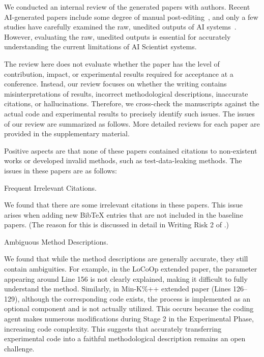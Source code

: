 \label{sec:author_evaluation}
We conducted an internal review of the generated papers with authors.
Recent AI-generated papers include some degree of manual post-editing~\citep{zochi2025, weng2025deepscientist}, and only a few studies have carefully examined the raw, unedited outputs of AI systems~\citep{yamada2025ai}.
However, evaluating the raw, unedited outputs is essential for accurately understanding the current limitations of AI Scientist systems.

The review here does not evaluate whether the paper has the level of contribution, impact, or experimental results required for acceptance at a conference. Instead, our review focuses on whether the writing contains misinterpretations of results, incorrect methodological descriptions, inaccurate citations, or hallucinations.
Therefore, we cross-check the manuscripts against the actual code and experimental results to precisely identify such issues.
The issues of our review are summarized as follows.
More detailed reviews for each paper are provided in the supplementary material.

Positive aspects are that none of these papers contained citations to non-existent works or developed invalid methods, such as test-data-leaking methods.
The issues in these papers are as follows:

\begin{tcolorbox}[colback=gray!10, colframe=gray!40!black, title=Issue1 :,breakable]
      Frequent Irrelevant Citations.
\end{tcolorbox}

We found that there are some irrelevant citations in these papers. This issue arises when adding new BibTeX entries that are not included in the baseline papers. (The reason for this is discussed in detail in Writing Risk 2 of .)

\begin{tcolorbox}[colback=gray!10, colframe=gray!40!black, title=Issue2 :,breakable]
      Ambiguous Method Descriptions.
\end{tcolorbox}


We found that while the method descriptions are generally accurate, they still contain ambiguities.
For example, in the LoCoOp extended paper, the parameter appearing around Line 156 is not clearly explained, making it difficult to fully understand the method.
Similarly, in Min-K\%++ extended paper (Lines 126–129), although the corresponding code exists, the process is implemented as an optional component and is not actually utilized.  This occurs because the coding agent makes numerous modifications during Stage 2 in the Experimental Phase, increasing code complexity. This suggests that accurately transferring experimental code into a faithful methodological description remains an open challenge.

